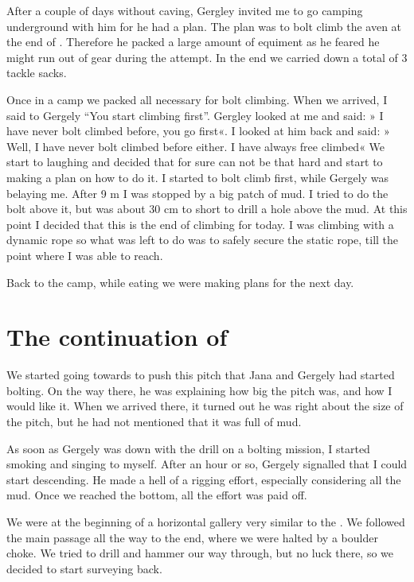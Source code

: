 After a couple of days without caving, Gergley invited me to go camping
underground with him for he had a plan. The plan was to bolt climb the
aven at the end of . Therefore he packed a
large amount of equiment as he feared he might run out of gear during
the attempt. In the end we carried down a total of 3 tackle sacks.

Once in a camp we packed all necessary for bolt climbing. When we
arrived, I said to Gergely ``You start climbing first''. Gergley looked
at me and said: » I have never bolt climbed before, you go first«. I
looked at him back and said: » Well, I have never bolt climbed before
either. I have always free climbed« We start to laughing and decided
that for sure can not be that hard and start to making a plan on how to
do it. I started to bolt climb first, while Gergely was belaying me.
After 9 m I was stopped by a big patch of mud. I tried to do the bolt
above it, but was about 30 cm to short to drill a hole above the mud. At
this point I decided that this is the end of climbing for today. I was
climbing with a dynamic rope so what was left to do was to safely secure
the static rope, till the point where I was able to reach.

Back to the camp, while eating we were making plans for the next day.



\section{\texorpdfstring{The continuation of }{The continuation of Stuck in Paradise}}

We started going towards  to push this pitch
that Jana and Gergely had started bolting. On the way there, he was
explaining how big the pitch was, and how I would like it. When we
arrived there, it turned out he was right about the size of the pitch,
but he had not mentioned that it was full of mud.

As soon as Gergely was down with the drill on a bolting mission, I
started smoking and singing to myself. After an hour or so, Gergely
signalled that I could start descending. He made a hell of a rigging
effort, especially considering all the mud. Once we reached the bottom,
all the effort was paid off.

We were at the beginning of a horizontal gallery very similar to the
. We followed the main passage all the way to
the end, where we were halted by a boulder choke. We tried to drill and
hammer our way through, but no luck there, so we decided to start
surveying back.

